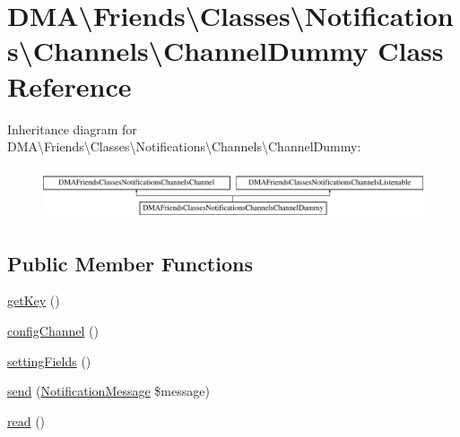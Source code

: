 \hypertarget{classDMA_1_1Friends_1_1Classes_1_1Notifications_1_1Channels_1_1ChannelDummy}{\section{D\-M\-A\textbackslash{}Friends\textbackslash{}Classes\textbackslash{}Notifications\textbackslash{}Channels\textbackslash{}Channel\-Dummy Class Reference}
\label{classDMA_1_1Friends_1_1Classes_1_1Notifications_1_1Channels_1_1ChannelDummy}
}
Inheritance diagram for D\-M\-A\textbackslash{}Friends\textbackslash{}Classes\textbackslash{}Notifications\textbackslash{}Channels\textbackslash{}Channel\-Dummy\-:\begin{figure}[H]
\begin{center}
\leavevmode
\includegraphics[height=1.530055cm]{df/dc6/classDMA_1_1Friends_1_1Classes_1_1Notifications_1_1Channels_1_1ChannelDummy}
\end{center}
\end{figure}
\subsection*{Public Member Functions}
\begin{DoxyCompactItemize}
\item 
\hyperlink{classDMA_1_1Friends_1_1Classes_1_1Notifications_1_1Channels_1_1ChannelDummy_a5c05bb750adc6c6daf381fe947efa15c}{get\-Key} ()
\item 
\hyperlink{classDMA_1_1Friends_1_1Classes_1_1Notifications_1_1Channels_1_1ChannelDummy_a3e250544631beeb6eca62c50be68ba10}{config\-Channel} ()
\item 
\hyperlink{classDMA_1_1Friends_1_1Classes_1_1Notifications_1_1Channels_1_1ChannelDummy_a69940e85c68e7d14c44c708eb59cbcb0}{setting\-Fields} ()
\item 
\hyperlink{classDMA_1_1Friends_1_1Classes_1_1Notifications_1_1Channels_1_1ChannelDummy_a204876b56d42c1fc9c8fedee59a4c42c}{send} (\hyperlink{classDMA_1_1Friends_1_1Classes_1_1Notifications_1_1NotificationMessage}{Notification\-Message} \$message)
\item 
\hyperlink{classDMA_1_1Friends_1_1Classes_1_1Notifications_1_1Channels_1_1ChannelDummy_a97f9f10a70e2b6274f6b3898fc03ea10}{read} ()
\end{DoxyCompactItemize}



